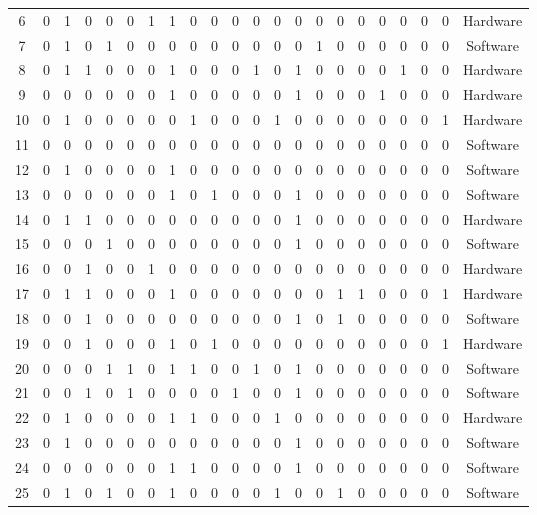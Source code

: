 \begin{table}[!ht]
\begin{center}
\begin{scriptsize}
\begin{tabular}{cccccccccccccccccccccc}
6 & 0 & 1 & 0 & 0 & 0 & 1 & 1 & 0 & 0 & 0 & 0 & 0 & 0 & 0 & 0 & 0 & 0 & 0 & 0 & 0 & Hardware\\
7 & 0 & 1 & 0 & 1 & 0 & 0 & 0 & 0 & 0 & 0 & 0 & 0 & 0 & 1 & 0 & 0 & 0 & 0 & 0 & 0 & Software\\
8 & 0 & 1 & 1 & 0 & 0 & 0 & 1 & 0 & 0 & 0 & 1 & 0 & 1 & 0 & 0 & 0 & 0 & 1 & 0 & 0 & Hardware\\
9 & 0 & 0 & 0 & 0 & 0 & 0 & 1 & 0 & 0 & 0 & 0 & 0 & 1 & 0 & 0 & 0 & 1 & 0 & 0 & 0 & Hardware\\
10 & 0 & 1 & 0 & 0 & 0 & 0 & 0 & 1 & 0 & 0 & 0 & 1 & 0 & 0 & 0 & 0 & 0 & 0 & 0 & 1 & Hardware\\
11 & 0 & 0 & 0 & 0 & 0 & 0 & 0 & 0 & 0 & 0 & 0 & 0 & 0 & 0 & 0 & 0 & 0 & 0 & 0 & 0 & Software\\
12 & 0 & 1 & 0 & 0 & 0 & 0 & 1 & 0 & 0 & 0 & 0 & 0 & 0 & 0 & 0 & 0 & 0 & 0 & 0 & 0 & Software\\
13 & 0 & 0 & 0 & 0 & 0 & 0 & 1 & 0 & 1 & 0 & 0 & 0 & 1 & 0 & 0 & 0 & 0 & 0 & 0 & 0 & Software\\
14 & 0 & 1 & 1 & 0 & 0 & 0 & 0 & 0 & 0 & 0 & 0 & 0 & 1 & 0 & 0 & 0 & 0 & 0 & 0 & 0 & Hardware\\
15 & 0 & 0 & 0 & 1 & 0 & 0 & 0 & 0 & 0 & 0 & 0 & 0 & 1 & 0 & 0 & 0 & 0 & 0 & 0 & 0 & Software\\
16 & 0 & 0 & 1 & 0 & 0 & 1 & 0 & 0 & 0 & 0 & 0 & 0 & 0 & 0 & 0 & 0 & 0 & 0 & 0 & 0 & Hardware\\
17 & 0 & 1 & 1 & 0 & 0 & 0 & 1 & 0 & 0 & 0 & 0 & 0 & 0 & 0 & 1 & 1 & 0 & 0 & 0 & 1 & Hardware\\
18 & 0 & 0 & 1 & 0 & 0 & 0 & 0 & 0 & 0 & 0 & 0 & 0 & 1 & 0 & 1 & 0 & 0 & 0 & 0 & 0 & Software\\
19 & 0 & 0 & 1 & 0 & 0 & 0 & 1 & 0 & 1 & 0 & 0 & 0 & 0 & 0 & 0 & 0 & 0 & 0 & 0 & 1 & Hardware\\
20 & 0 & 0 & 0 & 1 & 1 & 0 & 1 & 1 & 0 & 0 & 1 & 0 & 1 & 0 & 0 & 0 & 0 & 0 & 0 & 0 & Software\\
21 & 0 & 0 & 1 & 0 & 1 & 0 & 0 & 0 & 0 & 1 & 0 & 0 & 1 & 0 & 0 & 0 & 0 & 0 & 0 & 0 & Software\\
22 & 0 & 1 & 0 & 0 & 0 & 0 & 1 & 1 & 0 & 0 & 0 & 1 & 0 & 0 & 0 & 0 & 0 & 0 & 0 & 0 & Hardware\\
23 & 0 & 1 & 0 & 0 & 0 & 0 & 0 & 0 & 0 & 0 & 0 & 0 & 1 & 0 & 0 & 0 & 0 & 0 & 0 & 0 & Software\\
24 & 0 & 0 & 0 & 0 & 0 & 0 & 1 & 1 & 0 & 0 & 0 & 0 & 1 & 0 & 0 & 0 & 0 & 0 & 0 & 0 & Software\\
25 & 0 & 1 & 0 & 1 & 0 & 0 & 1 & 0 & 0 & 0 & 0 & 1 & 0 & 0 & 1 & 0 & 0 & 0 & 0 & 0 & Software\\

\end{tabular}
\end{scriptsize}
\end{center}
\end{table}
